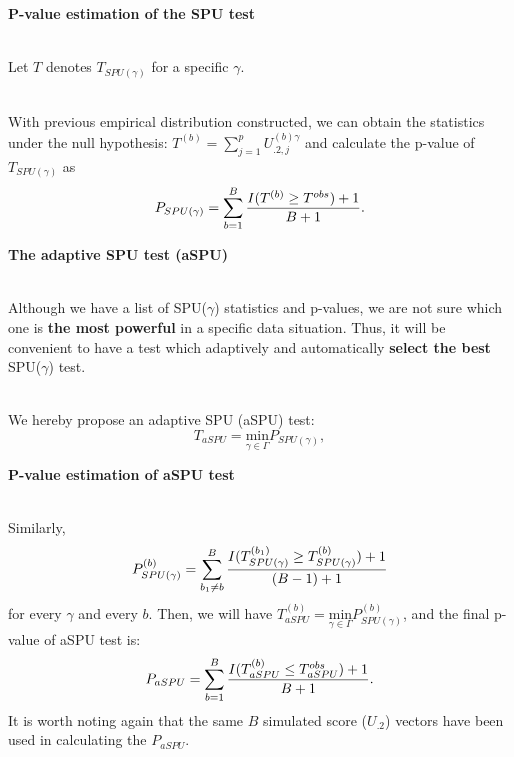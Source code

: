 \documentclass[compress]{beamer}
\begin{document}
{\framebreak
\textbf{P-value estimation of the SPU test }\\\

Let $T$ denotes $T_{ SPU(\gamma) }$ for a specific $\gamma$.\\\



With previous empirical distribution constructed, we can obtain the statistics under the null hypothesis: $T ^ {(b)} = \sum_{j=1}^p U^{ (b)\gamma }_{.2, j} $ and calculate the p-value of $T_{ SPU(\gamma) }$ as 
$$P_{ SPU(\gamma) } = \sum_{b=1}^B { I(T^{(b)} \geq T ^ {obs} ) + 1  \over B + 1 }. $$


\framebreak
\textbf{The adaptive SPU test (aSPU)}\\\

Although we have a list of SPU($\gamma$) statistics and p-values, we are not sure which one is \textbf{the most powerful} in a specific data situation. Thus, it will be convenient to have a test which adaptively and automatically \textbf{select the best} SPU($\gamma$) test.\\\

We hereby propose an adaptive SPU (aSPU) test:
$$
T_{aSPU} = \underset{\gamma\in\Gamma}{ \textrm{min} } P_{ SPU(\gamma) },
$$

\framebreak
\textbf{P-value estimation of aSPU test }\\\

Similarly,
$$
P^{ (b) }_{ SPU(\gamma) } =  \sum_{b_1 \neq b}^B { I(T^{ (b_1) }_{ SPU(\gamma) } \geq T^{ (b) }_{ SPU(\gamma) } ) + 1  \over (B-1) + 1 } 
$$
for every $\gamma$ and every $b$. Then, we will have $ 
T ^ {(b)} _{aSPU} = \underset{\gamma\in\Gamma}{ \textrm{min} } P^{ (b) }_{ SPU(\gamma) }
$, and the final p-value of aSPU test is:
$$
P_{aSPU} = \sum_{b=1}^B { I(T ^ {(b)} _{aSPU} \leq T ^ {obs} _{aSPU} ) + 1  \over B + 1 }.
$$
It is worth noting again that the same $B$ simulated score ($U_{.2}$) vectors have been used in calculating the $P_{aSPU}$. 

}
\end{document}
